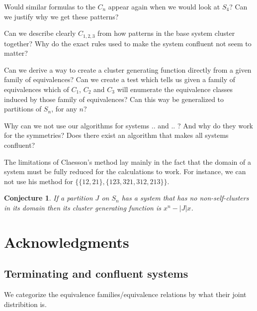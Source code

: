 \documentclass[openany, a4paper, 11pt, english]{article}
\newtheorem{conjecture}[theorem]{Conjecture}
\theoremstyle{definition}
\newcommand{\Sym}{S}
\begin{document}
Would similar formulas to the $C_n$ appear again when we would
look at $\Sym_4$? Can we justify why we get these patterns?

Can we describe clearly $C_{1,2,3}$ from how patterns in the base system cluster together?
Why do the exact rules used to make the system confluent not seem to matter?

Can we derive a way to create a cluster generating function directly from a
given family of equivalences? Can we create a test which tells us given a family
of equivalences which of $C_1$, $C_2$ and $C_3$ will enumerate the equivalence
classes induced by those family of equivalences?
Can this way be generalized to partitions of $\Sym_n$, for any $n$?

Why can we not use our algorithms for systems .. and .. ? And why do they work
for the symmetries? Does there exist an algorithm that makes all systems confluent?

The limitations of Claesson's method lay mainly in the fact that the domain of a
system must be fully reduced for the calculations to work. For instance, we can not use his
method for $\{ \{ 12, 21 \}, \{ 123, 321, 312, 213 \} \}$.

\begin{conjecture}
    If a partition $J$ on $\Sym_n$ has a system that has no non-self-clusters in
    its domain then its cluster generating function is $x^n-|J|x$.
\end{conjecture}

\section*{Acknowledgments}




\begin{appendices}
\section{Terminating and confluent systems}
We categorize the equivalence families/equivalence relations by what their joint
distribition is.
\begin{multicols}{2}

\end{multicols}
\end{appendices}
\end{document}
